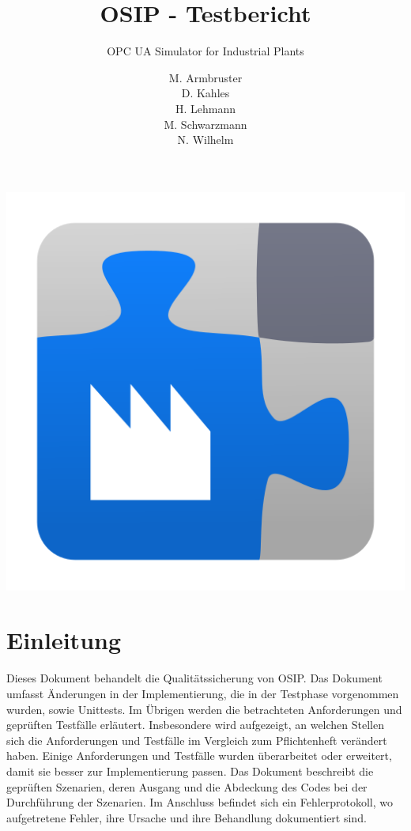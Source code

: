 \documentclass[parskip=full]{scrartcl}
\title{OSIP - Testbericht}
\subtitle{OPC UA Simulator for Industrial Plants}
\author{
    M. Armbruster\\
    D. Kahles\\
    H. Lehmann\\
    M. Schwarzmann\\
    N. Wilhelm
}
\begin{document}
\maketitle
\thispagestyle{empty}
\vspace{20px}
\begin{center}
  \includegraphics[scale=0.4]{../icon.png}
\end{center}
\pagebreak
\tableofcontents
\pagebreak

\section{Einleitung}
Dieses Dokument behandelt die Qualitätssicherung von OSIP.
Das Dokument umfasst Änderungen in der Implementierung, die in der Testphase vorgenommen wurden, sowie Unittests.
Im Übrigen werden die betrachteten Anforderungen und geprüften Testfälle erläutert.
Insbesondere wird aufgezeigt, an welchen Stellen sich die Anforderungen und Testfälle im Vergleich zum Pflichtenheft verändert haben. Einige Anforderungen und Testfälle wurden überarbeitet oder erweitert, damit sie besser zur Implementierung passen.
Das Dokument beschreibt die geprüften Szenarien, deren Ausgang und die Abdeckung des Codes bei der Durchführung der Szenarien.
Im Anschluss befindet sich ein Fehlerprotokoll, wo aufgetretene Fehler, ihre Ursache und ihre Behandlung dokumentiert sind.
\end{document}
